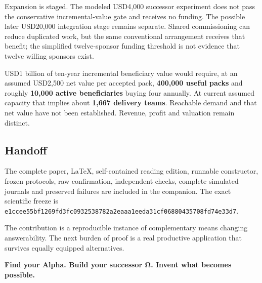 \documentclass[
  10pt,
]{article}
\begin{document}
Expansion is staged. The modeled USD4,000 successor experiment does not
pass the conservative incremental-value gate and receives no funding.
The possible later USD20,000 integration stage remains separate. Shared
commissioning can reduce duplicated work, but the same conventional
arrangement receives that benefit; the simplified twelve-sponsor funding
threshold is not evidence that twelve willing sponsors exist.

USD1 billion of ten-year incremental beneficiary value would require, at
an assumed USD2,500 net value per accepted pack, \textbf{400,000 useful
packs} and roughly \textbf{10,000 active beneficiaries} buying four
annually. At current assumed capacity that implies about \textbf{1,667
delivery teams}. Reachable demand and that net value have not been
established. Revenue, profit and valuation remain distinct.

\hypertarget{handoff}{%
\subsection{Handoff}\label{handoff}}

The complete paper, LaTeX, self-contained reading edition, runnable
constructor, frozen protocols, raw confirmation, independent checks,
complete simulated journals and preserved failures are included in the
companion. The exact scientific freeze is
\texttt{e1ccee55bf1269fd3fc0932538782a2eaaa1eeda31cf06880435708fd74e33d7}.

The contribution is a reproducible instance of complementary means
changing answerability. The next burden of proof is a real productive
application that survives equally equipped alternatives.

\textbf{Find your Alpha. Build your successor Ω. Invent what becomes
possible.}
\end{document}

